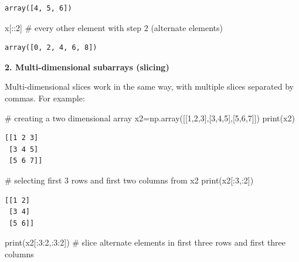 \documentclass[
  letterpaper,
  DIV=11,
  numbers=noendperiod]{scrreprt}
\newenvironment{Shaded}{\begin{snugshade}}{\end{snugshade}}
\newcommand{\BuiltInTok}[1]{\textcolor[rgb]{0.00,0.23,0.31}{#1}}
\newcommand{\CommentTok}[1]{\textcolor[rgb]{0.37,0.37,0.37}{#1}}
\newcommand{\DecValTok}[1]{\textcolor[rgb]{0.68,0.00,0.00}{#1}}
\newcommand{\NormalTok}[1]{\textcolor[rgb]{0.00,0.23,0.31}{#1}}
\newcommand{\OperatorTok}[1]{\textcolor[rgb]{0.37,0.37,0.37}{#1}}
\theoremstyle{plain}
\theoremstyle{definition}
\theoremstyle{remark}
\begin{document}
\begin{verbatim}
array([4, 5, 6])
\end{verbatim}

\begin{Shaded}
\begin{Highlighting}[]
\NormalTok{x[::}\DecValTok{2}\NormalTok{]  }\CommentTok{\# every other element with step 2 (alternate elements)}
\end{Highlighting}
\end{Shaded}

\begin{verbatim}
array([0, 2, 4, 6, 8])
\end{verbatim}

\textbf{2. Multi-dimensional subarrays (slicing)}

Multi-dimensional slices work in the same way, with multiple slices
separated by commas. For example:

\begin{Shaded}
\begin{Highlighting}[]
\CommentTok{\# creating a two dimensional array}
\NormalTok{x2}\OperatorTok{=}\NormalTok{np.array([[}\DecValTok{1}\NormalTok{,}\DecValTok{2}\NormalTok{,}\DecValTok{3}\NormalTok{],[}\DecValTok{3}\NormalTok{,}\DecValTok{4}\NormalTok{,}\DecValTok{5}\NormalTok{],[}\DecValTok{5}\NormalTok{,}\DecValTok{6}\NormalTok{,}\DecValTok{7}\NormalTok{]])}
\BuiltInTok{print}\NormalTok{(x2)}
\end{Highlighting}
\end{Shaded}

\begin{verbatim}
[[1 2 3]
 [3 4 5]
 [5 6 7]]
\end{verbatim}

\begin{Shaded}
\begin{Highlighting}[]
\CommentTok{\# selecting first 3 rows and first two columns from x2}
\BuiltInTok{print}\NormalTok{(x2[:}\DecValTok{3}\NormalTok{,:}\DecValTok{2}\NormalTok{])}
\end{Highlighting}
\end{Shaded}

\begin{verbatim}
[[1 2]
 [3 4]
 [5 6]]
\end{verbatim}

\begin{Shaded}
\begin{Highlighting}[]
\BuiltInTok{print}\NormalTok{(x2[:}\DecValTok{3}\NormalTok{:}\DecValTok{2}\NormalTok{,:}\DecValTok{3}\NormalTok{:}\DecValTok{2}\NormalTok{]) }\CommentTok{\# slice alternate elements in first three rows and first three columns}
\end{Highlighting}
\end{Shaded}
\end{document}
